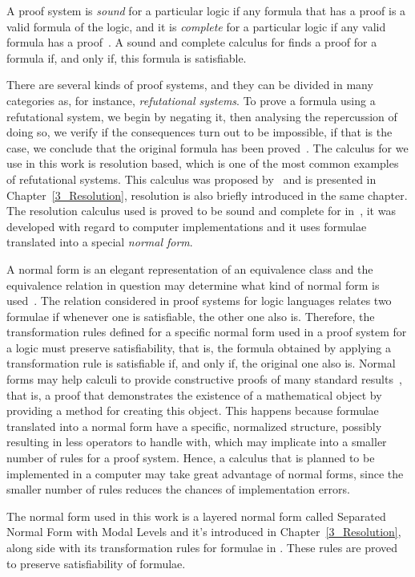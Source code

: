 A proof system is \emph{sound} for a particular logic if any formula that has a
proof is a valid formula of the logic, and it is \emph{complete} for a
particular logic if any valid formula has a proof~\cite{fitting}. A sound and
complete calculus for  finds a proof for a formula if, and only
if, this formula is satisfiable.

There are several kinds of proof systems, and they can be divided in many
categories as, for instance, \emph{refutational systems}. To prove a formula
using a refutational system, we begin by negating it, then analysing the
repercussion %
of doing so, we verify if the consequences turn out to be impossible, if that is
the case, we conclude that the original formula has been proved~\cite{fitting}.
The calculus for  we use in this work is resolution based,
which is one of the most common examples of refutational systems. This calculus
was proposed by~\cite{nalon2015modal} and is presented in
Chapter~\ref{3_Resolution}, resolution is also briefly introduced in the same
chapter. The resolution calculus used is proved to be sound and complete for
 in~\cite{nalon2015modal}, it was developed with regard to
computer implementations and it uses formulae translated into a special
\emph{normal form}.

A normal form is an elegant representation of an equivalence class and the
equivalence relation in question may determine what kind of normal form is
used~\cite{normalformtheory}. The relation considered in proof systems for logic
languages relates two formulae if whenever one is satisfiable, the other one
also is. Therefore, the transformation rules defined for a specific normal form
used in a proof system for a logic must preserve satisfiability, that is, the
formula obtained by applying a transformation rule is satisfiable if, and only
if, the original one also is. Normal forms may help calculi to provide constructive
proofs of many standard results~\cite{fine1975}, that is, a proof that
demonstrates the existence of a mathematical object by providing a method for
creating this object. This happens because formulae translated into a normal
form have a specific, normalized structure, possibly resulting in less operators
to handle with, which may implicate into a smaller number of rules for a proof
system. Hence, a calculus that is planned to be implemented in a computer may
take great advantage of normal forms, since the smaller number of rules reduces
the chances of implementation errors. 

The normal form used in this work is a layered normal form called Separated
Normal Form with Modal Levels and it's introduced in Chapter~\ref{3_Resolution},
along side with its transformation rules for formulae in . These
rules are proved to preserve satisfiability of formulae. 
